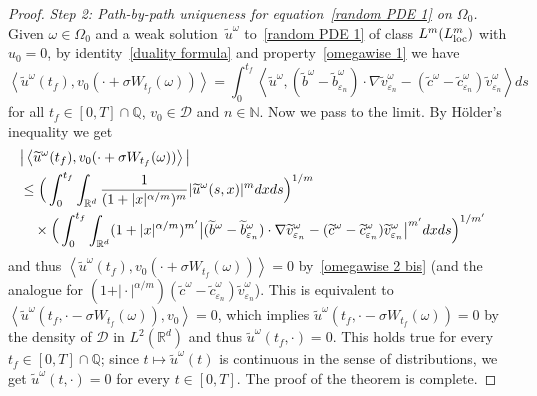 \documentclass[a4paper,10pt]{article}
\newcommand\1{\mathbbm{1}}
\newcommand{\eps}{\varepsilon}
\newcommand\loc{{\rm loc}}
\numberwithin{equation}{section}
\begin{document}
\begin{proof}
\emph{Step 2: Path-by-path uniqueness for equation~\eqref{random PDE 1} on $\Omega_{0}$.} Given $\omega\in\Omega_{0}$ and a weak solution~$\widetilde{u}^\omega$ to~\eqref{random PDE 1} of class $L^{m}(L^{m}_\loc)$ with $u_{0}=0$, by identity~\eqref{duality formula} and property~\eqref{omegawise 1} we have 
\begin{equation*}
\left\langle \widetilde{u}^\omega (t_{f}),v_{0}(\cdot+\sigma W_{t_{f}}(\omega)) \right\rangle =\int_{0}^{t_{f}}\left\langle \widetilde{u}^\omega,( \widetilde{b}^\omega  -\widetilde{b}_{\eps_{n}}^\omega ) \cdot\nabla\widetilde{v}_{\eps_{n}}^\omega  -(\widetilde{c}^\omega -\widetilde{c}_{\eps_{n}}^\omega )  \widetilde{v}_{\eps_{n}}^\omega  \right\rangle ds
\end{equation*}
for all $t_{f}\in [0,T] \cap\mathbb{Q}$, $v_{0}\in\mathcal{D}$ and $n\in\mathbb{N}$. Now we pass to the limit. By H\"older's inequality we get
\begin{align*}
\lefteqn{\big\vert \left\langle \widetilde{u}^\omega (t_{f})
,v_{0}(\cdot+\sigma W_{t_{f}}(\omega))\right\rangle \big\vert } \\
&  \leq \Big( \int_{0}^{t_{f}}\int_{\mathbb{R}^{d}}\frac{1}{(1+\vert x \vert^{\alpha/m} )^{m}} \vert \widetilde{u}^\omega(s,x) \vert^{m}dxds \Big)  ^{1/m}\\
& \quad {} \times \Big( \int_{0}^{t_{f}} \int_{\mathbb{R}^{d}} (1+\vert x\vert^{\alpha/m})^{m^{\prime}} \big\vert (\widetilde{b}^\omega  -\widetilde{b}_{\eps_{n}}^\omega ) \cdot \nabla\widetilde{v}_{\eps_{n}}^\omega  -(  \widetilde{c}^\omega -\widetilde{c}_{\eps_{n}}^\omega )  \widetilde{v}_{\eps_{n}}^\omega \big\vert^{m^{\prime}}dxds \Big)^{1/m^{\prime}}
\end{align*}
and thus $\left\langle \widetilde{u}^\omega(t_{f}),v_{0}(\cdot+\sigma W_{t_{f}}(\omega))\right\rangle =0$ by~\eqref{omegawise 2 bis} (and the analogue for $( 1+ \vert \cdot \vert^{\alpha/m}) ( \widetilde{c}^\omega -\widetilde{c}_{\eps_{n}}^\omega ) \widetilde{v}_{\eps_{n}}^\omega$). This is equivalent to $\left\langle \widetilde{u}^\omega(t_{f},\cdot-\sigma W_{t_{f}}(\omega) )  ,v_{0}\right\rangle =0$, which implies $\widetilde{u}^\omega(t_{f},\cdot-\sigma W_{t_{f}}(\omega))  =0$ by the density of $\mathcal{D}$ in $L^{2}(\mathbb{R}^{d})$ and thus $\widetilde{u}^\omega(t_{f},\cdot)  =0$. This holds true for every $t_{f}\in [0,T] \cap\mathbb{Q}$; since $t\mapsto \widetilde{u}^\omega(t)$ is continuous in the sense of distributions, we get $\widetilde{u}^\omega(t,\cdot) =0$ for every $t \in [0,T]$. The proof of the theorem is complete.
\end{proof}
\end{document}
